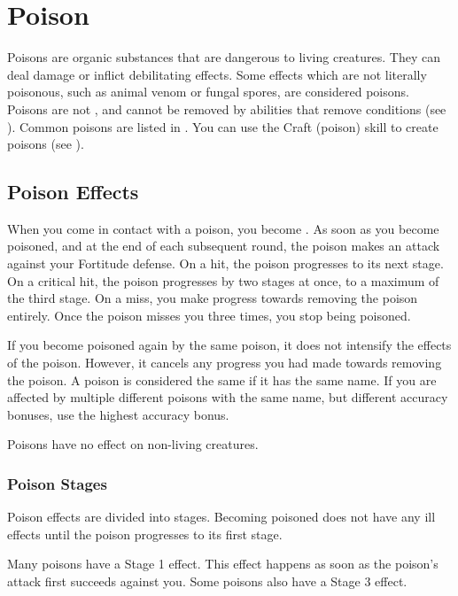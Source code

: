 \section{Poison}\label{Poison}
  Poisons are organic substances that are dangerous to living creatures.
  They can deal damage or inflict debilitating effects.
  Some effects which are not literally poisonous, such as animal venom or fungal spores, are considered poisons.
  Poisons are not , and cannot be removed by abilities that remove conditions (see ).
  Common poisons are listed in .
  You can use the Craft (poison) skill to create poisons (see ).

  \subsection{Poison Effects}\label{Poison Effects}
    When you come in contact with a poison, you become .
    As soon as you become poisoned, and at the end of each subsequent round, the poison makes an attack against your Fortitude defense.
    On a hit, the poison progresses to its next stage.
    On a critical hit, the poison progresses by two stages at once, to a maximum of the third stage.
    On a miss, you make progress towards removing the poison entirely.
    Once the poison misses you three times, you stop being poisoned.

    If you become poisoned again by the same poison, it does not intensify the effects of the poison.
    However, it cancels any progress you had made towards removing the poison.
    A poison is considered the same if it has the same name.
    If you are affected by multiple different poisons with the same name, but different accuracy bonuses, use the highest accuracy bonus.

    Poisons have no effect on non-living creatures.

    \subsubsection{Poison Stages}
      Poison effects are divided into stages.
      Becoming poisoned does not have any ill effects until the poison progresses to its first stage.

      Many poisons have a Stage 1 effect.
      This effect happens as soon as the poison's attack first succeeds against you.
      Some poisons also have a Stage 3 effect.

